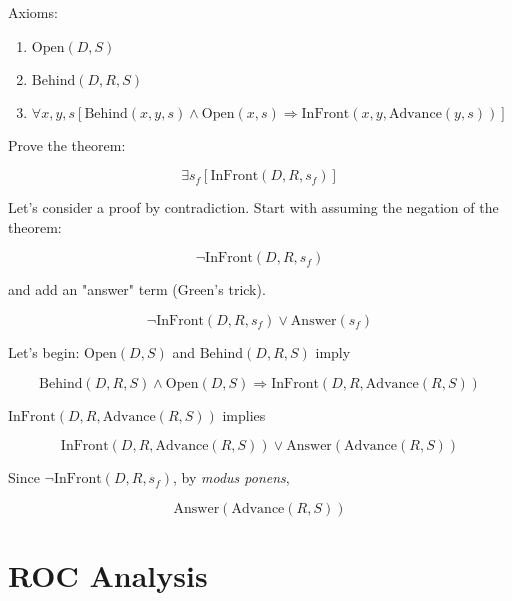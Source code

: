 \documentclass[11pt,largemargins, anonymous]{homework}
\begin{document}
Axioms:

\begin{enumerate}
    \item \( \mathrm{Open}(D, S) \)
    \item \( \mathrm{Behind}(D, R, S) \)
    \item \( \forall x, y, s [ \mathrm{Behind}(x, y, s) \land \mathrm{Open}(x, s) \Rightarrow \mathrm{InFront}(x, y, \mathrm{Advance}(y, s)) ] \)
\end{enumerate}

Prove the theorem:

\[ \exists s_f [ \mathrm{InFront}(D, R, s_f)] \]

Let's consider a proof by contradiction.
Start with assuming the negation of the theorem:

\[ \neg \mathrm{InFront}(D, R, s_f) \]

and add an "answer" term (Green's trick).

\[ \neg \mathrm{InFront}(D, R, s_f) \lor \mathrm{Answer}(s_f) \]

Let's begin: \( \mathrm{Open}(D, S) \) and \( \mathrm{Behind}(D, R, S) \) imply

\[ \mathrm{Behind}(D, R, S) \land \mathrm{Open}(D, S) \Rightarrow \mathrm{InFront}(D, R, \mathrm{Advance}(R, S)) \]

\( \mathrm{InFront}(D, R, \mathrm{Advance}(R, S)) \) implies

\[ \mathrm{InFront}(D, R, \mathrm{Advance}(R, S)) \lor \mathrm{Answer}(\mathrm{Advance}(R, S)) \]

Since \( \neg \mathrm{InFront}(D, R, s_f) \), by \textit{modus ponens},

\[ \mathrm{Answer}(\mathrm{Advance}(R, S)) \]

\clearpage
\maketitle
\clearpage
\part{ROC Analysis}

\question
\end{document}
